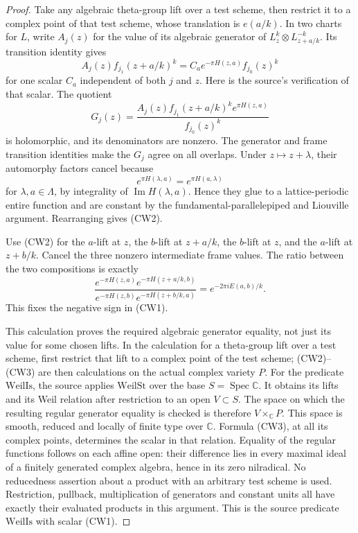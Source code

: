 \begin{proof}
Take any algebraic theta-group lift over a test scheme, then restrict
it to a complex point of that test scheme, whose translation is
\(e(a/k)\).  In two charts for \(L\), write \(A_j(z)\) for the value
of its algebraic generator of
\(L_z^k\otimes L_{z+a/k}^{-k}\).  Its transition identity gives
\[
       A_j(z)f_{j_1}(z+a/k)^k
                    =C_a e^{-\pi H(z,a)} f_{j_0}(z)^k      \tag{CW2}
\]
for one scalar \(C_a\) independent of both \(j\) and \(z\).
Here is the source's verification of that scalar.
The quotient
\[
 G_j(z)=
   \frac{A_j(z)f_{j_1}(z+a/k)^k e^{\pi H(z,a)}}
        {f_{j_0}(z)^k}
\]
is holomorphic, and its denominators are nonzero.
The generator and frame transition identities make the \(G_j\)
agree on all overlaps.  Under \(z\mapsto z+\lambda\), their
automorphy factors cancel because
\[
             e^{\pi H(\lambda,a)}=e^{\pi H(a,\lambda)}
\]
for \(\lambda,a\in\Lambda\), by integrality of
\(\operatorname{Im}H(\lambda,a)\).  Hence they glue to a lattice-periodic
entire function and are constant by the fundamental-parallelepiped
and Liouville argument.  Rearranging gives (CW2).

Use (CW2) for the \(a\)-lift at \(z\), the \(b\)-lift at \(z+a/k\),
the \(b\)-lift at \(z\), and the \(a\)-lift at \(z+b/k\).
Cancel the three nonzero intermediate frame values.
The ratio between the two compositions is exactly
\[
 \frac{e^{-\pi H(z,a)}e^{-\pi H(z+a/k,b)}}
      {e^{-\pi H(z,b)}e^{-\pi H(z+b/k,a)}}
       = e^{-2\pi i E(a,b)/k}.                             \tag{CW3}
\]
This fixes the negative sign in (CW1).

This calculation proves the required algebraic generator equality,
not just its value for some chosen lifts.  In the calculation for a
theta-group lift over a test scheme, first restrict that lift to a
complex point of the test scheme; (CW2)--(CW3) are then calculations
on the actual complex variety \(P\).
For the predicate \(\mathrm{WeilIs}\), the source applies
\(\mathrm{WeilSt}\) over the base \(S=\operatorname{Spec}\mathbb C\).
It obtains its lifts and its Weil relation after restriction to an
open \(V\subset S\).  The space on which the resulting regular
generator equality is checked is therefore \(V\times_{\mathbb C}P\).
This space is smooth, reduced and locally of finite type over
\(\mathbb C\).  Formula (CW3), at all its complex points, determines
the scalar in that relation.  Equality of the regular functions
follows on each affine open: their difference lies in every maximal
ideal of a finitely generated complex algebra, hence in its zero
nilradical.  No reducedness assertion about a product with an
arbitrary test scheme is used.
Restriction, pullback, multiplication of generators and constant
units all have exactly their evaluated products in this argument.
This is the source predicate \(\mathrm{WeilIs}\) with scalar (CW1).


\end{proof}
